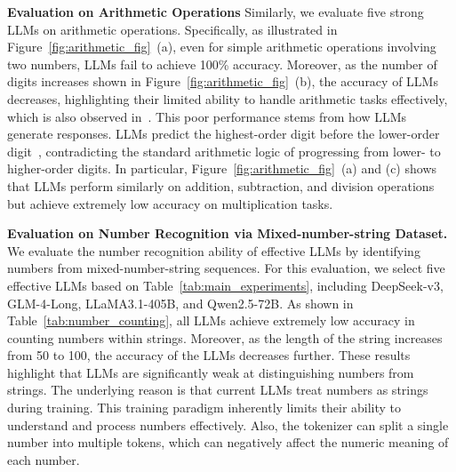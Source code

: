 \noindent \textbf{Evaluation on Arithmetic Operations}
Similarly, 
we evaluate five strong LLMs on arithmetic operations.
Specifically, as illustrated in Figure~\ref{fig:arithmetic_fig}~(a), even for simple arithmetic operations involving two numbers, LLMs fail to achieve 100\% accuracy. 
Moreover, as the number of digits increases shown in Figure~\ref{fig:arithmetic_fig}~(b), the accuracy of LLMs decreases, highlighting their limited ability to handle arithmetic tasks effectively, which is also observed in~\citep{qiu2024dissecting}.
This poor performance stems from how LLMs generate responses. LLMs  predict the highest-order digit  before the lower-order digit~\citep{zhang2024reverse}, contradicting the standard arithmetic logic of progressing from lower- to higher-order digits.
In particular, Figure~\ref{fig:arithmetic_fig}~(a) and (c) shows that LLMs perform similarly on addition, subtraction, and division operations but achieve extremely low accuracy on multiplication tasks.






\noindent \textbf{Evaluation on Number Recognition via Mixed-number-string Dataset.}
We evaluate the number recognition ability of effective LLMs by identifying numbers from mixed-number-string sequences. For this evaluation, we select five  effective LLMs based on Table~\ref{tab:main_experiments}, including DeepSeek-v3, GLM-4-Long, LLaMA3.1-405B, and Qwen2.5-72B.
As shown in Table~\ref{tab:number_counting}, all LLMs achieve extremely low accuracy in counting numbers within strings. Moreover, as the length of the string increases from 50 to 100, the accuracy of the LLMs decreases further.
These results highlight that LLMs are significantly weak at distinguishing numbers from strings. The underlying reason is that current LLMs treat numbers as strings during training. 
This training paradigm inherently limits their ability to understand and process numbers effectively.
Also, the tokenizer can split a single number into multiple tokens, which can negatively affect the numeric meaning of each number.








